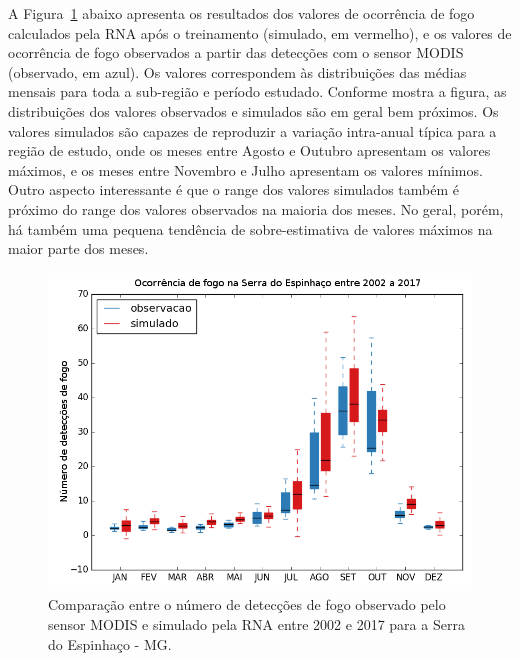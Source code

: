 \documentclass[conference]{IEEEtran}
\begin{document}
A Figura~\ref{resultados}  abaixo apresenta os resultados dos valores de ocorrência de fogo calculados pela RNA após o treinamento (simulado, em vermelho), e os valores de ocorrência de fogo observados a partir das detecções com o sensor MODIS (observado, em azul). Os valores correspondem às distribuições das médias mensais para toda a sub-região e período estudado. Conforme mostra a figura, as distribuições dos valores observados e simulados são em geral bem próximos. Os valores simulados são capazes de reproduzir a variação intra-anual típica para a região de estudo, onde os meses entre Agosto e Outubro apresentam os valores máximos, e os meses entre Novembro e Julho apresentam os valores mínimos. Outro aspecto interessante é que o range dos valores simulados também é próximo do range dos valores observados na maioria dos meses. No geral, porém, há também uma pequena tendência de sobre-estimativa de valores máximos na maior parte dos meses.
\begin{figure}[htbp]
\centerline{\includegraphics[width=0.42\paperwidth]{figuras/resultados.png}}
\caption{Comparação entre o número de detecções de fogo observado pelo sensor MODIS e simulado pela RNA entre 2002 e 2017 para a Serra do Espinhaço - MG.}
\label{resultados}
\end{figure}
\end{document}
